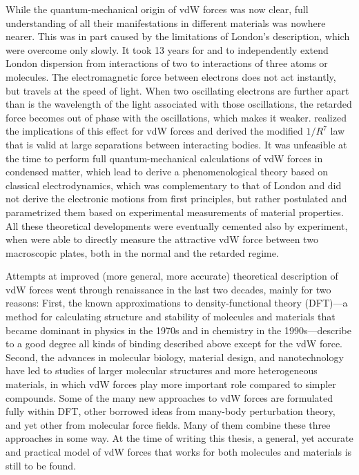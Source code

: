 While the quantum-mechanical origin of vdW forces was now clear, full understanding of all their manifestations in different materials was nowhere nearer.
This was in part caused by the limitations of London's description, which were overcome only slowly.
It took 13 years for \citet{AxilrodJCP43} and \citet{MutoNS43} to independently extend London dispersion from interactions of two to interactions of three atoms or molecules.
The electromagnetic force between electrons does not act instantly, but travels at the speed of light.
When two oscillating electrons are further apart than is the wavelength of the light associated with those oscillations, the retarded force becomes out of phase with the oscillations, which makes it weaker.
\citet{CasimirPR48} realized the implications of this effect for vdW forces and derived the modified $1/R^7$ law that is valid at large separations between interacting bodies.
It was unfeasible at the time to perform full quantum-mechanical calculations of vdW forces in condensed matter, which lead \citet{LifshitzSPJ56} to derive a phenomenological theory based on classical electrodynamics, which was complementary to that of London and did not derive the electronic motions from first principles, but rather postulated and parametrized them based on experimental measurements of material properties.
All these theoretical developments were eventually cemented also by experiment, when \citet{TaborPRSLA69} were able to directly measure the attractive vdW force between two macroscopic plates, both in the normal and the retarded regime.

Attempts at improved (more general, more accurate) theoretical description of vdW forces went through renaissance in the last two decades, mainly for two reasons:
First, the known approximations to density-functional theory (DFT)---a method for calculating structure and stability of molecules and materials that became dominant in physics in the 1970s and in chemistry in the 1990s---describe to a good degree all kinds of binding described above except for the vdW force.
Second, the advances in molecular biology, material design, and nanotechnology have led to studies of larger molecular structures and more heterogeneous materials, in which vdW forces play more important role compared to simpler compounds.
Some of the many new approaches to vdW forces are formulated fully within DFT, other borrowed ideas from many-body perturbation theory, and yet other from molecular force fields.
Many of them combine these three approaches in some way.
At the time of writing this thesis, a general, yet accurate and practical model of vdW forces that works for both molecules and materials is still to be found.

